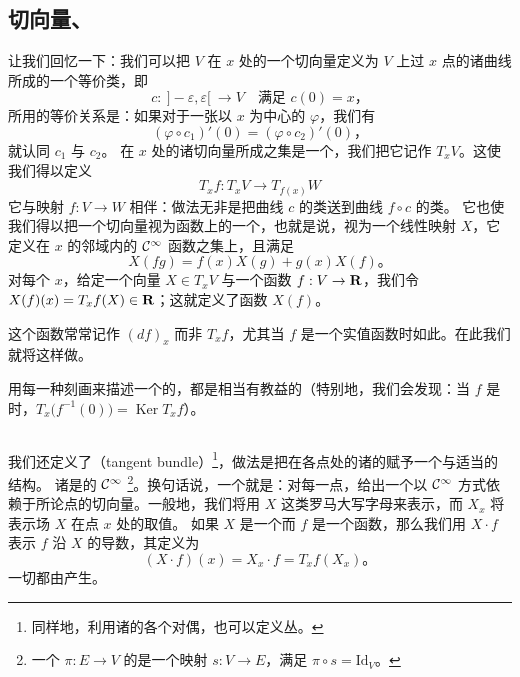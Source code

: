 \subsection{切向量、\trTangentMap}
\label{subsec:tangent-vectors-tangent-maps}

让我们回忆一下：我们可以把\trManifold{} $V$ 在 $x$ 处的一个切向量定义为 $V$ 上过 $x$ 点的诸曲线所成的一个等价类，即
\[
c:\ ]-\varepsilon,\varepsilon[\ \longrightarrow V\quad\text{满足 }c(0)=x\text{，}
\]
所用的等价关系是：如果对于一张以 $x$ 为中心的\trChart{} $\varphi$，我们有
\[
(\varphi\circ c_{1})'(0)=(\varphi\circ c_{2})'(0)\text{，}
\]
就认同 $c_{1}$ 与 $c_{2}$。
在 $x$ 处的诸切向量所成之集是一个\trVectorSpace，我们把它记作 $T_{x}V$。这使我们得以定义\trTangentMap
\[
T_{x}f:T_{x}V\longrightarrow T_{f(x)}W
\]
它与映射 $f:V\to W$ 相伴：做法无非是把曲线 $c$ 的类送到曲线 $f\circ c$ 的类。
它也使我们得以把一个切向量视为函数上的一个\trDerivation，也就是说，视为一个线性映射 $X$，它定义在 $x$ 的邻域内的 $\mathcal{C}^{\infty}$ 函数之集上，且满足
\[
X(fg)=f(x)X(g)+g(x)X(f)\text{。}
\]
对每个 $x$，给定一个向量 $X\in T_{x}V$ 与一个函数 $f:V\to\mathbf{R}$，我们令 $X(f)(x)=T_{x}f(X)\in\mathbf{R}$；这就定义了函数 $X(f)$。

\begin{remark}\label{thm:df-notation}
这个函数常常记作 $(df)_{x}$ 而非 $T_{x}f$，尤其当 $f$ 是一个实值函数时如此。在此我们就将这样做。
\end{remark}

用每一种刻画来描述一个\trSubmanifold{}的\trTangentSpace，都是相当有教益的（特别地，我们会发现：当 $f$ 是\trSubmersion{}时，$T_{x}\bigl(f^{-1}(0)\bigr)=\operatorname{Ker}T_{x}f$）。

\subsection{\trVectorField}
\label{subsec:vector-fields}

我们还定义了\textbf{\trTangentBundle}（tangent bundle）\footnote{同样地，利用诸\trTangentSpace{}的各个对偶，也可以定义\trCotangent{}丛。}，做法是把\trManifold{}在各点处的诸\trTangentSpace{}的\trDisjointUnion{}赋予一个\trTopology{}与适当的\trManifold{}结构。
诸\trVectorField{}是\trTangentBundle{}的 $\mathcal{C}^{\infty}$ \trSection\footnote{一个\trVectorBundle{} $\pi:E\to V$ 的\trSection{}是一个映射 $s:V\to E$，满足 $\pi\circ s=\mathrm{Id}_{V}$。}。换句话说，一个\trVectorField{}就是：对每一点，给出一个以 $\mathcal{C}^{\infty}$ 方式依赖于所论点的切向量。一般地，我们将用 $X$ 这类罗马大写字母来表示\trVectorField，而 $X_{x}$ 将表示场 $X$ 在点 $x$ 处的取值。
如果 $X$ 是一个\trVectorField{}而 $f$ 是一个函数，那么我们用 $X\cdot f$ 表示 $f$ 沿 $X$ 的导数，其定义为
\[
(X\cdot f)(x)=X_{x}\cdot f=T_{x}f(X_{x})\text{。}
\]
一切\trDerivation{}都由\trVectorField{}产生。

